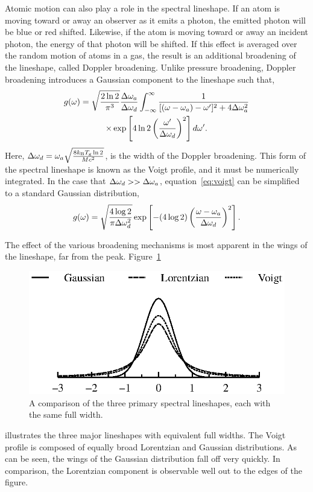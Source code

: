 Atomic motion can also play a role in the spectral lineshape. If an atom is
moving toward or away an observer as it emits a photon, the emitted photon will
be blue or red shifted. Likewise, if the atom is moving toward or away an
incident photon, the energy of that photon will be shifted. If this effect is
averaged over the random motion of atoms in a gas, the result is an additional
broadening of the lineshape, called Doppler broadening. Unlike pressure
broadening, Doppler broadening introduces a Gaussian component to the lineshape
such that,
\begin{multline}
  g(\omega) = \sqrt{\frac{2\ln{2}}{\pi^3}}\frac{\Delta \omega_a}{\Delta \omega_d}
  \int_{-\infty}^\infty
  \frac{1}{[(\omega - \omega_a) - \omega']^2 + 4\Delta \omega_a^2} \\
  \times \exp\left[4\ln{2}\left(\frac{\omega'}{\Delta \omega_d}\right)^2\right]d\omega'.
  \label{eq:voigt}
\end{multline}
Here, $\Delta \omega_d = \omega_a\sqrt{\frac{8k_\mathrm{B}T_\mathrm{g}\ln{2}} {Mc^2}}$, is
the width of the Doppler broadening. This form of the spectral lineshape is
known as the Voigt profile, and it must be numerically integrated. In the case
that $\Delta \omega_d >> \Delta \omega_a$, equation~\ref{eq:voigt} can be simplified to a standard
Gaussian distribution,
\begin{equation}
  g(\omega) = \sqrt{\frac{4\log{2}}{\pi\Delta \omega_d^2}}
  \exp\left[-(4\log{2})\left(\frac{\omega-\omega_a}{\Delta \omega_d}\right)^2\right].
\end{equation}

The effect of the various broadening mechanisms is most apparent in the wings of
the lineshape, far from the peak. Figure~\ref{fig:lineshapes}
\begin{figure}
  \centering
  \includegraphics{./chapters/theory/figures/lineshapes.eps}
  \caption{A comparison of the three primary spectral lineshapes, each with the
  same full width.}
  \label{fig:lineshapes}
\end{figure}
illustrates the three major lineshapes with equivalent full widths. The Voigt
profile is composed of equally broad Lorentzian and Gaussian distributions. As
can be seen, the wings of the Gaussian distribution fall off very quickly. In
comparison, the Lorentzian component is observable well out to the edges of the
figure. 

